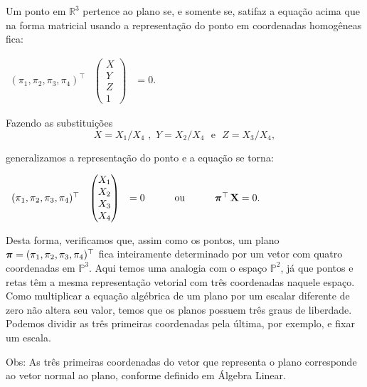 Um ponto em $\mathbb{R}^3$ pertence ao plano se, e somente se, satifaz a equação acima que na forma matricial usando a representação do ponto em coordenadas homogêneas fica:

\begin{center}
$
\begin{array}{ccc}
  (\pi_1,\pi_2,\pi_3,\pi_4)^\top
& \begin{pmatrix}
  X\\
  Y\\
  Z\\
  1
  \end{pmatrix}
& = 0.
\end{array}
$
\end{center}

Fazendo as substituições 
\begin{equation*}
X=X_1/X_4 \,\, , \,\, Y=X_2/X_4 \,\,\,\, \text{e} \,\,\,\, Z=X_3/X_4 ,
\end{equation*}

generalizamos a representação do ponto e a equação se torna:

\begin{center}
$
\begin{array}{ccccc}
(\pi_1,\pi_2,\pi_3,\pi_4)^\top
& \begin{pmatrix}
  X_1\\
  X_2\\
  X_3\\
  X_4
  \end{pmatrix}
& = 0
& \qquad \text{ou} \qquad
& \boldsymbol{\pi}^\top \, \mathbf{X} = 0.
\end{array}
$
\end{center}


Desta forma, verificamos que, assim como os pontos, um plano $\boldsymbol{\pi} = (\pi_1,\pi_2,\pi_3,\pi_4)^\top$ fica inteiramente determinado por um vetor com quatro coordenadas em $\mathbb{P}^3$. Aqui temos uma analogia com o espaço $\mathbb{P}^2$, já que pontos e retas têm a mesma representação vetorial com três coordenadas naquele espaço. Como multiplicar a equação algébrica de um plano por um escalar diferente de zero não altera seu valor, temos que os planos possuem três graus de liberdade. Podemos dividir as três primeiras coordenadas pela última, por exemplo, e fixar um escala.

Obs: As três primeiras coordenadas do vetor que representa o plano corresponde ao vetor normal ao plano, conforme definido em Álgebra Linear.
\\



